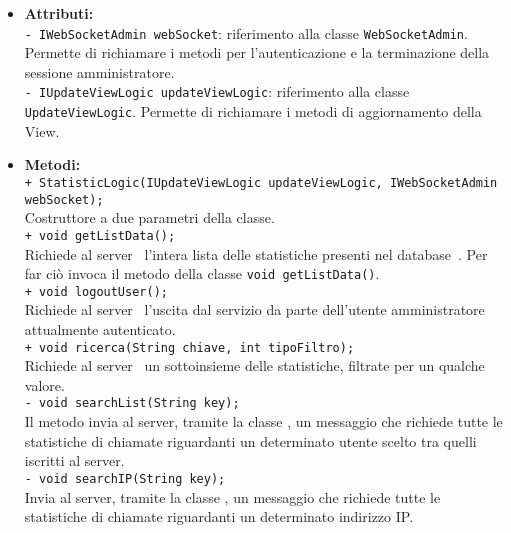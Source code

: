 {{\begin{sloppypar}
{{\begin{itemize}
				\item[] \textbf{Attributi:}{\\
					\texttt{- IWebSocketAdmin webSocket}: riferimento alla classe \texttt{WebSocketAdmin}. Permette di richiamare i metodi per l'autenticazione e la terminazione della sessione amministratore.\\

					\texttt{- IUpdateViewLogic updateViewLogic}: riferimento alla classe \texttt{UpdateViewLogic}. Permette di richiamare i metodi di aggiornamento della View.\\
				}

				\item[] \textbf{Metodi:}{ \\
					\texttt{+ StatisticLogic(IUpdateViewLogic updateViewLogic, IWebSocketAdmin webSocket);}\\
					Costruttore a due parametri della classe.\\
				
					\texttt{+ void getListData();}\\
					Richiede al server\g~ l'intera lista delle statistiche presenti nel database\g~. Per far ciò invoca il metodo della classe  \texttt{void getListData()}.\\
					
					\texttt{+ void logoutUser();}\\
					Richiede al server\g~ l'uscita dal servizio da parte dell'utente amministratore attualmente autenticato.\\
					
					\texttt{+ void ricerca(String chiave, int tipoFiltro);}\\
					Richiede al server\g~ un sottoinsieme delle statistiche, filtrate per un qualche valore.\\
				
					\texttt{- void searchList(String key);}\\
					Il metodo invia al server\g, tramite la classe , un messaggio che richiede tutte le statistiche di chiamate riguardanti un determinato utente scelto tra quelli iscritti al server\g.\\

					\texttt{- void searchIP(String key);}\\
					Invia al server\g, tramite la classe , un messaggio che richiede tutte le statistiche di chiamate riguardanti un determinato indirizzo IP\g.\\

}
\end{itemize}}}
\end{sloppypar}}}
